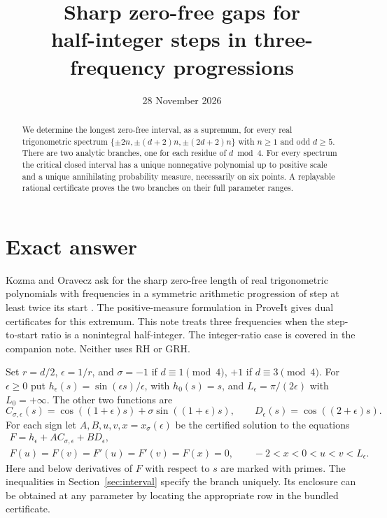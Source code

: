 \documentclass[11pt]{article}
\title{Sharp zero-free gaps for\\half-integer steps in three-frequency progressions}
\author{}
\date{28 November 2026}
\begin{document}
\maketitle
\vspace{-2em}
\begin{abstract}
We determine the longest zero-free interval, as a supremum, for
every real trigonometric spectrum \(\{\pm 2n,\pm(d+2)n,\pm(2d+2)n\}\)
with \(n\ge1\) and odd \(d\ge5\). There are two analytic branches,
one for each residue of \(d\bmod4\). For every spectrum the critical
closed interval has a unique nonnegative polynomial up to positive
scale and a unique annihilating probability measure, necessarily
on six points. A replayable rational certificate proves the two
branches on their full parameter ranges.
\end{abstract}

\section{Exact answer}
Kozma and Oravecz ask for the sharp zero-free length of real
trigonometric polynomials with frequencies in a symmetric arithmetic
progression of step at least twice its start \cite[Question~1]{KO}.
The positive-measure formulation in ProveIt \cite{P} gives dual
certificates for this extremum. This note treats three frequencies when
the step-to-start ratio is a nonintegral half-integer. The integer-ratio
case is covered in the companion note. Neither uses RH or GRH.

Set \(r=d/2\), \(\epsilon=1/r\), and
\(\sigma=-1\) if \(d\equiv1\pmod4\), \(+1\) if \(d\equiv3\pmod4\).
For \(\epsilon\ge 0\) put \(h_\epsilon(s)=\sin(\epsilon s)/\epsilon\),
with \(h_0(s)=s\), and \(L_\epsilon=\pi/(2\epsilon)\) with \(L_0=+\infty\).
The other two functions are
\[
 C_{\sigma,\epsilon}(s)=\cos((1+\epsilon)s)+\sigma\sin((1+\epsilon)s),
 \qquad D_\epsilon(s)=\cos((2+\epsilon)s).
\]
For each sign let \(A,B,u,v,x=x_\sigma(\epsilon)\) be the certified
solution to the equations
\begin{gather*}
 F=h_\epsilon+A C_{\sigma,\epsilon}+B D_\epsilon,\\
 F(u)=F(v)=F'(u)=F'(v)=F(x)=0,\qquad -2<x<0<u<v<L_\epsilon.
\end{gather*}
Here and below derivatives of \(F\) with respect to \(s\) are marked
with primes. The inequalities in Section~\ref{sec:interval} specify
the branch uniquely. Its enclosure can be obtained at any parameter
by locating the appropriate row in the bundled certificate.
\end{document}
